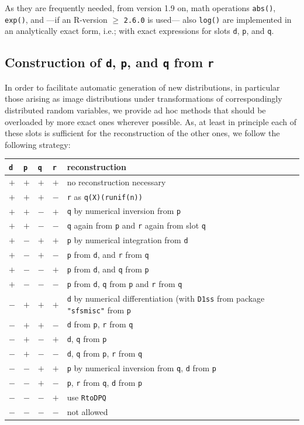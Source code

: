 \documentclass[11pt]{article}
\newcommand{\code}[1]{{\tt #1}}
\newcommand{\pkg}[1]{{\tt "#1"}}
\begin{document}
As they are frequently needed, from version 1.9 on, math operations 
\code{abs()}, \code{exp()}, and ---if an {\sf R}-version $\ge$ {\tt 2.6.0} is 
used--- also \code{log()} are implemented in an analytically exact form, 
i.e.; with exact expressions for slots \code{d}, \code{p}, and \code{q}.

%
\subsection{Construction of \code{d}, \code{p}, and \code{q} from \code{r}}
%
In order to facilitate automatic generation of new distributions, in particular 
those arising as image distributions under transformations of correspondingly 
distributed random variables, we provide ad hoc methods that should be 
overloaded by more exact ones wherever possible. As, at least in principle
each of these slots is sufficient for the reconstruction of the other ones,
we follow the following strategy:
\\
\begin{center}
\begin{tabular}{llll|p{10cm}}
\code{d} & \code{p} &  \code{q} & \code{r} & reconstruction\\
\hline
$+$&$+$&$+$&$+$&no reconstruction necessary\\
$+$&$+$&$+$&$-$&\code{r} as \code{q(X)(runif(n))}\\
$+$&$+$&$-$&$+$&\code{q} by numerical inversion from \code{p}\\
$+$&$+$&$-$&$-$&\code{q} again from \code{p} and 
                         \code{r} again from slot \code{q}\\
$+$&$-$&$+$&$+$&\code{p} by numerical integration from \code{d}\\
$+$&$-$&$+$&$-$&\code{p} from \code{d}, and \code{r} from  \code{q}\\
$+$&$-$&$-$&$+$&\code{p} from \code{d}, and \code{q} from  \code{p}\\
$+$&$-$&$-$&$-$&\code{p} from \code{d}, 
\code{q} from \code{p} and \code{r} from  \code{q}\\
$-$&$+$&$+$&$+$&\code{d} by numerical differentiation (with \code{D1ss}
from package \pkg{sfsmisc} from \code{p}\\
$-$&$+$&$+$&$-$&\code{d} from \code{p}, \code{r} from \code{q}\\
$-$&$+$&$-$&$+$&\code{d}, \code{q}  from \code{p}\\
$-$&$+$&$-$&$-$&\code{d}, \code{q}  from \code{p}, \code{r} from \code{q}\\
$-$&$-$&$+$&$+$&\code{p} by numerical inversion from \code{q},
                \code{d} from \code{p}\\
$-$&$-$&$+$&$-$&\code{p}, \code{r} from \code{q}, \code{d} from \code{p}\\
$-$&$-$&$-$&$+$& use \code{RtoDPQ}\\
$-$&$-$&$-$&$-$&not allowed\\
\end{tabular}
\end{center}
\end{document}
